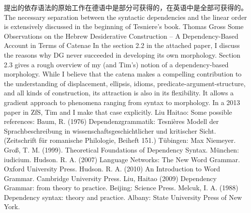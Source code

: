 %
\citet{Tesniere59a-u}提出的依存语法的原始工作在德语\citep{Tesniere80a-u}中是部分可获得的，在英语中是全部可获得的\citep{Tesniere2015a-not-crossreferenced}。
%
%
%
%
The necessary separation between the syntactic dependencies and the linear order is extensively
discussed in the beginning of Tesniere's book.
%
Thomas Gross
Some Observations on the Hebrew Desiderative Construction – A Dependency-Based Account in Terms of Catenae
%
In the section 2.2 in the attached paper, I discuss the reasons why DG never succeeded in developing its own morphology. Section 2.3 gives a rough overview of my (and Tim's) notion of a dependency-based morphology.
%
While I believe that the catena makes a compelling contribution to the understanding of displacement, ellipsis, idioms, predicate-argument-structure, and all kinds of construction, its attraction is also in its flexibility. It allows a gradient approach to phenomena ranging from syntax to morphology. In a 2013 paper in ZfS, Tim and I make that case explicitly.
%
Liu Haitao:
%
Some possible references:
%
Baum, R. (1976) Dependenzgrammatik: Tesnières Modell der Sprachbeschreibung in wissenschaftsgeschichtlicher und kritischer Sicht. (Zeitschrift für romanische Philologie, Beiheft 151.) Tübingen: Max Niemeyer.
Groß, T. M. (1999). Theoretical Foundations of Dependency Syntax. München: iudicium.
Hudson. R. A. (2007) Language Networks: The New Word Grammar. Oxford University Press.
Hudson. R. A. (2010) An Introduction to Word Grammar. Cambridge University Press.
Liu, Haitao (2009) Dependency Grammar: from theory to practice. Beijing: Science Press. 
Melcuk, I. A. (1988) Dependency syntax: theory and practice. Albany: State University Press of New York.
